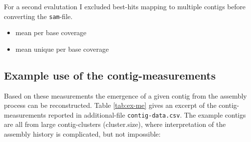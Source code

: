 For a second evalutation I excluded best-hits mapping to multiple
contigs before converting the \texttt{sam}-file. 
\begin{itemize}
\item mean per base coverage
\item mean unique per base coverage

\end{itemize}

\subsection{Example use of the contig-measurements}

Based on these measurements the emergence of a given contig from the
assembly process can be reconstructed. Table \ref{tab:ex-me} gives an
excerpt of the contig-measurements reported in additional-file
\texttt{contig-data.csv}. The example contigs are all from large
contig-clusters (cluster.size), where interpretation of the assembly
history is complicated, but not impossible:

